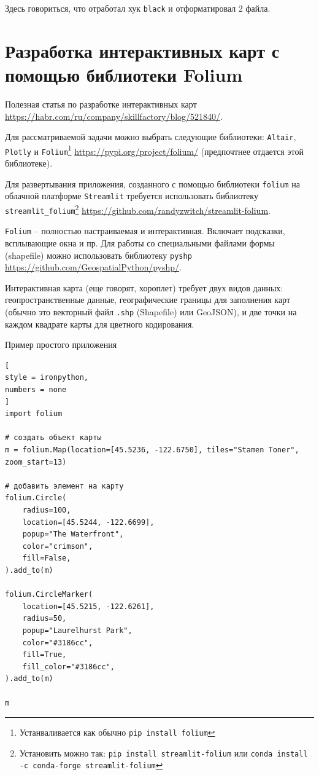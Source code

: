 \documentclass[%
	11pt,
	a4paper,
	utf8,
		]{article}
\begin{document}
Здесь говориться, что отработал хук \texttt{black} и отформатировал 2 файла.


\section{Разработка интерактивных карт с помощью библиотеки Folium}

Полезная статья по разработке интерактивных карт \url{https://habr.com/ru/company/skillfactory/blog/521840/}.

Для рассматриваемой задачи можно выбрать следующие библиотеки: \texttt{Altair}, \texttt{Plotly} и \texttt{Folium}\footnote{Устанваливается как обычно \texttt{pip install folium}} \url{https://pypi.org/project/folium/} (предпочтнее отдается этой библиотеке).

Для развертывания приложения, созданного с помощью библиотеки \texttt{folium} на облачной платформе \texttt{Streamlit} требуется использовать библиотеку \texttt{streamlit\_folium}\footnote{Установить можно так: \texttt{pip install streamlit-folium} или \texttt{conda install -c conda-forge streamlit-folium}} \url{https://github.com/randyzwitch/streamlit-folium}.

\texttt{Folium} -- полностью настраиваемая и интерактивная. Включает подсказки, всплывающие окна и пр. Для работы со специальными файлами формы (shapefile) можно использовать библиотеку \texttt{pyshp} \url{https://github.com/GeospatialPython/pyshp/}.

Интерактивная карта (еще говорят, хороплет) требует двух видов данных: геопространственные данные, географические границы для заполнения карт (обычно это векторный файл \texttt{.shp} (Shapefile) или GeoJSON), и две точки на каждом квадрате карты для цветного кодирования.

Пример простого приложения
\begin{lstlisting}[
style = ironpython,
numbers = none	
]
import folium

# создать объект карты
m = folium.Map(location=[45.5236, -122.6750], tiles="Stamen Toner", zoom_start=13)

# добавить элемент на карту
folium.Circle(
    radius=100,
    location=[45.5244, -122.6699],
    popup="The Waterfront",
    color="crimson",
    fill=False,
).add_to(m)

folium.CircleMarker(
    location=[45.5215, -122.6261],
    radius=50,
    popup="Laurelhurst Park",
    color="#3186cc",
    fill=True,
    fill_color="#3186cc",
).add_to(m)

m
\end{lstlisting}
\end{document}
